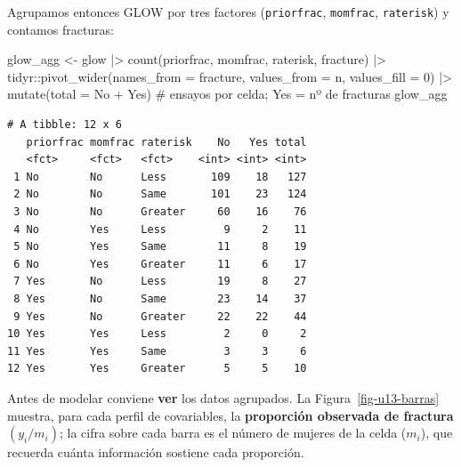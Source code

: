 \documentclass[
  letterpaper,
  DIV=11,
  numbers=noendperiod]{scrartcl}
\newenvironment{Shaded}{\begin{snugshade}}{\end{snugshade}}
\newcommand{\AttributeTok}[1]{\textcolor[rgb]{0.40,0.45,0.13}{#1}}
\newcommand{\CommentTok}[1]{\textcolor[rgb]{0.37,0.37,0.37}{#1}}
\newcommand{\DecValTok}[1]{\textcolor[rgb]{0.68,0.00,0.00}{#1}}
\newcommand{\FunctionTok}[1]{\textcolor[rgb]{0.28,0.35,0.67}{#1}}
\newcommand{\NormalTok}[1]{\textcolor[rgb]{0.00,0.23,0.31}{#1}}
\newcommand{\OtherTok}[1]{\textcolor[rgb]{0.00,0.23,0.31}{#1}}
\newcommand{\SpecialCharTok}[1]{\textcolor[rgb]{0.37,0.37,0.37}{#1}}
\begin{document}
Agrupamos entonces GLOW por tres factores (\texttt{priorfrac},
\texttt{momfrac}, \texttt{raterisk}) y contamos fracturas:

\begin{Shaded}
\begin{Highlighting}[]
\NormalTok{glow\_agg }\OtherTok{\textless{}{-}}\NormalTok{ glow }\SpecialCharTok{|\textgreater{}}
  \FunctionTok{count}\NormalTok{(priorfrac, momfrac, raterisk, fracture) }\SpecialCharTok{|\textgreater{}}
\NormalTok{  tidyr}\SpecialCharTok{::}\FunctionTok{pivot\_wider}\NormalTok{(}\AttributeTok{names\_from =}\NormalTok{ fracture, }\AttributeTok{values\_from =}\NormalTok{ n, }\AttributeTok{values\_fill =} \DecValTok{0}\NormalTok{) }\SpecialCharTok{|\textgreater{}}
  \FunctionTok{mutate}\NormalTok{(}\AttributeTok{total =}\NormalTok{ No }\SpecialCharTok{+}\NormalTok{ Yes)            }\CommentTok{\# ensayos por celda; Yes = nº de fracturas}
\NormalTok{glow\_agg}
\end{Highlighting}
\end{Shaded}

\begin{verbatim}
# A tibble: 12 x 6
   priorfrac momfrac raterisk    No   Yes total
   <fct>     <fct>   <fct>    <int> <int> <int>
 1 No        No      Less       109    18   127
 2 No        No      Same       101    23   124
 3 No        No      Greater     60    16    76
 4 No        Yes     Less         9     2    11
 5 No        Yes     Same        11     8    19
 6 No        Yes     Greater     11     6    17
 7 Yes       No      Less        19     8    27
 8 Yes       No      Same        23    14    37
 9 Yes       No      Greater     22    22    44
10 Yes       Yes     Less         2     0     2
11 Yes       Yes     Same         3     3     6
12 Yes       Yes     Greater      5     5    10
\end{verbatim}

Antes de modelar conviene \textbf{ver} los datos agrupados. La
Figura~\ref{fig-u13-barras} muestra, para cada perfil de covariables, la
\textbf{proporción observada de fractura} \((y_i/m_i)\); la cifra sobre
cada barra es el número de mujeres de la celda (\(m_i\)), que recuerda
cuánta información sostiene cada proporción.
\end{document}
